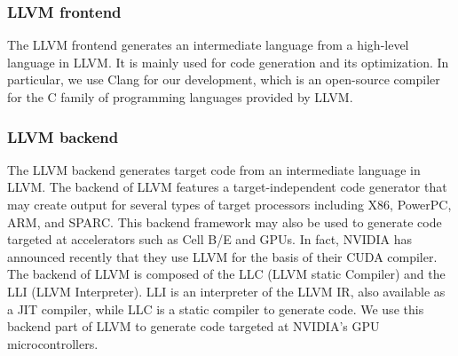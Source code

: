 \subsubsection{LLVM frontend}\label{set:clang}

The LLVM frontend generates an intermediate language from a high-level
language in LLVM.
It is mainly used for code generation and its optimization.
In particular, we use Clang for our development, which is an open-source
compiler for the C family of programming languages provided by LLVM.

\subsubsection{LLVM backend}\label{set:backend}

The LLVM backend generates target code from an intermediate language in
LLVM.
The backend of LLVM features a target-independent code generator that
may create output for several types of target processors including X86,
PowerPC, ARM, and SPARC. 
This backend framework may also be used to generate code targeted at
accelerators such as Cell B/E and GPUs.
In fact, NVIDIA has announced recently that they use LLVM for the basis
of their CUDA compiler.
The backend of LLVM is composed of the LLC (LLVM static Compiler) and
the LLI (LLVM Interpreter).
LLI is an interpreter of the LLVM IR, also available as a JIT compiler,
while LLC is a static compiler to generate code.
We use this backend part of LLVM to generate code targeted at NVIDIA's
GPU microcontrollers.

